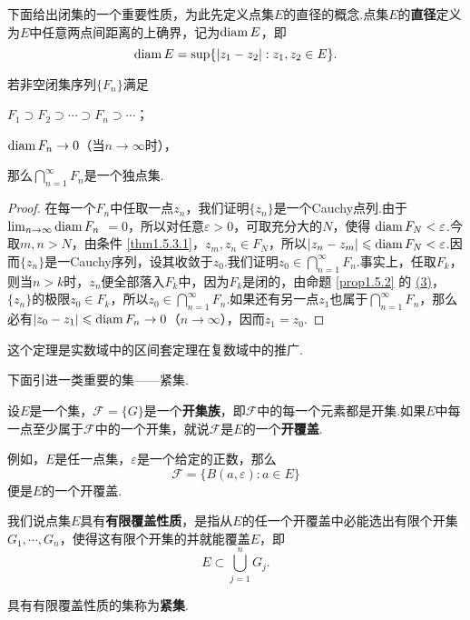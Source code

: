 下面给出闭集的一个重要性质，为此先定义点集$E$的直径的概念.点集$E$的\textbf{直径}定义为$E$中任意两点间距离的上确界，记为$\operatorname{diam} E$，即
\[
  \operatorname{diam} E = \sup\{ |z_1 - z_2|: z_1,z_2\in E \}.
\]

\begin{theorem}\label{thm1.5.3}
  若非空闭集序列$\{F_n\}$满足
  \begin{eenum}
    \item \label{thm1.5.3.1} $F_1\supset F_2\supset\cdots\supset F_n\supset\cdots$；
    \item \label{thm1.5.3.2} $\operatorname{diam} F_n\to 0$（当$n\to\infty$时），
  \end{eenum}
  那么$\bigcap_{n=1}^\infty F_n$是一个独点集.
\end{theorem}
\begin{proof}
  在每一个$F_n$中任取一点$z_n$，我们证明$\{z_n\}$是一个Cauchy点列.由于$\lim_{n\to\infty}\operatorname{diam} F_n$ $=0$，所以对任意$\varepsilon>0$，可取充分大的$N$，使得 $\operatorname{diam} F_N<\varepsilon$.今取$m,n>N$，由条件 \ref{thm1.5.3.1}，$z_m,z_n\in F_N$，所以$|z_n-z_m|\leqslant\operatorname{diam} F_N<\varepsilon$.因而$\{z_n\}$是一Cauchy序列，设其收敛于$z_0$.我们证明$z_0\in\bigcap_{n=1}^\infty F_n$.事实上，任取$F_k$，则当$n>k$时，$z_n$便全部落入$F_k$中，因为$F_k$是闭的，由命题 \ref{prop1.5.2} 的 \hyperlink{prop1.5.2.3}{(3)}，$\{z_n\}$的极限$z_0\in F_k$，所以$z_0\in\bigcap_{n=1}^\infty F_n$.如果还有另一点$z_1$也属于$\bigcap_{n=1}^\infty F_n$，那么必有$|z_0-z_1|\leqslant\operatorname{diam} F_n\to0$（$n\to\infty$），因而$z_1=z_0$.
\end{proof}

这个定理是实数域中的区间套定理在复数域中的推广.

下面引进一类重要的集——紧集.

设$E$是一个集，$\mathscr F=\{G\}$是一个\textbf{开集族}，即$\mathscr F$中的每一个元素都是开集.如果$E$中每一点至少属于$\mathscr F$中的一个开集，就说$\mathscr F$是$E$的一个\textbf{开覆盖}.

例如，$E$是任一点集，$\varepsilon$是一个给定的正数，那么
\[
  \mathscr F = \{ B(a,\varepsilon):a\in E \}
\]
便是$E$的一个开覆盖.

我们说点集$E$具有\textbf{有限覆盖性质}，是指从$E$的任一个开覆盖中必能选出有限个开集$G_1,\cdots,G_n$，使得这有限个开集的并就能覆盖$E$，即
\[
  E \subset \bigcup_{j=1}^n G_j.
\]
\begin{definition}\label{def1.5.4}
  具有有限覆盖性质的集称为\textbf{紧集}.
\end{definition}

